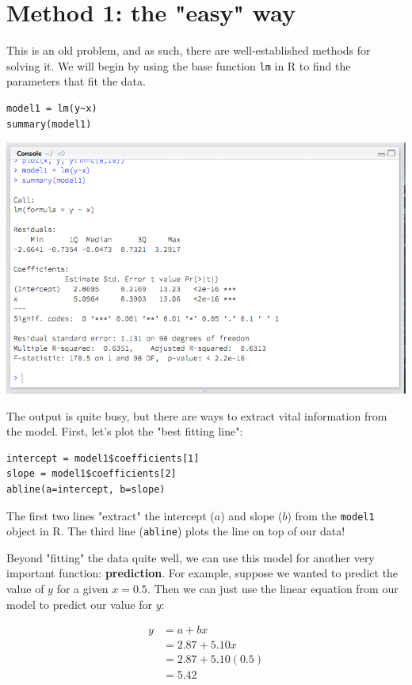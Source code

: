 \documentclass[11pt]{article}
\begin{document}
\section*{Method 1: the "easy" way}
\label{sec-4}

This is an old problem, and as such, there are well-established methods for solving it.  We will begin by using the base function \texttt{lm} in R to find the parameters that fit the data.

\begin{verbatim}
model1 = lm(y~x)
summary(model1)
\end{verbatim}

\includegraphics[width=.9\linewidth]{figures/week7/lmOutput.png}

The output is quite busy, but there are ways to extract vital information from the model.  First, let's plot the "best fitting line":

\begin{verbatim}
intercept = model1$coefficients[1]
slope = model1$coefficients[2]
abline(a=intercept, b=slope)
\end{verbatim}

The first two lines "extract" the intercept ($a$) and slope ($b$) from the \texttt{model1} object in R.  The third line (\texttt{abline}) plots the line on top of our data!

Beyond "fitting" the data quite well, we can use this model for another very important function: \textbf{prediction}.  For example, suppose we wanted to predict the value of $y$ for a given $x=0.5$.  Then we can just use the linear equation from our model to predict our value for $y$:

\begin{align*}
y & = a + bx\\
  & = 2.87 + 5.10x\\
  & = 2.87 + 5.10(0.5)\\
  & = 5.42\\
\end{align*}
\end{document}
